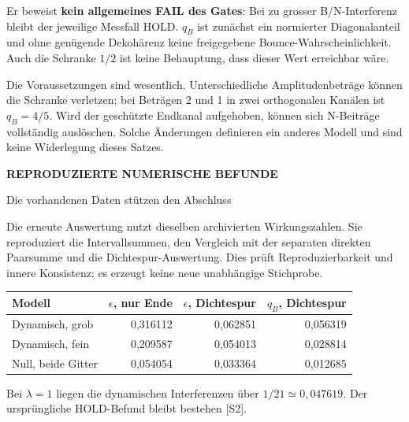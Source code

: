 \documentclass[11pt,a4paper]{article}
\newcommand{\kicker}[1]{{\sffamily\bfseries\small\color{teal}#1}\par}
\newcommand{\tit}[1]{{\sffamily\bfseries\LARGE\raggedright #1\par}\vspace{3pt}}
\newcommand{\sect}[1]{\par\vspace{3pt}{\sffamily\bfseries\large #1}\par}
\begin{document}
\sect{Was der Satz allein nicht beweist}
Er beweist \textbf{kein allgemeines FAIL des Gates}: Bei zu grosser B/N-Interferenz bleibt der jeweilige Messfall HOLD. $q_B$ ist zunächst ein normierter Diagonalanteil und ohne genügende Dekohärenz keine freigegebene Bounce-Wahrscheinlichkeit. Auch die Schranke $1/2$ ist keine Behauptung, dass dieser Wert erreichbar wäre.

Die Voraussetzungen sind wesentlich. Unterschiedliche Amplitudenbeträge können die Schranke verletzen; bei Beträgen 2 und 1 in zwei orthogonalen Kanälen ist $q_B=4/5$. Wird der geschützte Endkanal aufgehoben, können sich N-Beiträge vollständig auslöschen. Solche Änderungen definieren ein anderes Modell und sind keine Widerlegung dieses Satzes.

\newpage
\kicker{REPRODUZIERTE NUMERISCHE BEFUNDE}
\tit{Die vorhandenen Daten stützen den Abschluss}
Die erneute Auswertung nutzt dieselben archivierten Wirkungszahlen. Sie reproduziert die Intervallsummen, den Vergleich mit der separaten direkten Paarsumme und die Dichtespur-Auswertung. Dies prüft Reproduzierbarkeit und innere Konsistenz; es erzeugt keine neue unabhängige Stichprobe.

\sect{27 Entwicklungspfade: Interferenz bleibt entscheidend}
\par\begin{tabularx}{\linewidth}{@{}Yrrr@{}}\toprule
\textbf{Modell} & $\epsilon$, nur Ende & $\epsilon$, Dichtespur & $q_B$, Dichtespur\\\midrule
Dynamisch, grob & 0,316112 & 0,062851 & 0,056319\\
Dynamisch, fein & 0,209587 & 0,054013 & 0,028814\\
Null, beide Gitter & 0,054054 & 0,033364 & 0,012685\\\bottomrule
\end{tabularx}\par\vspace{3pt}
Bei $\lambda=1$ liegen die dynamischen Interferenzen über $1/21\simeq0{,}047619$. Der ursprüngliche HOLD-Befund bleibt bestehen [S2].
\end{document}
